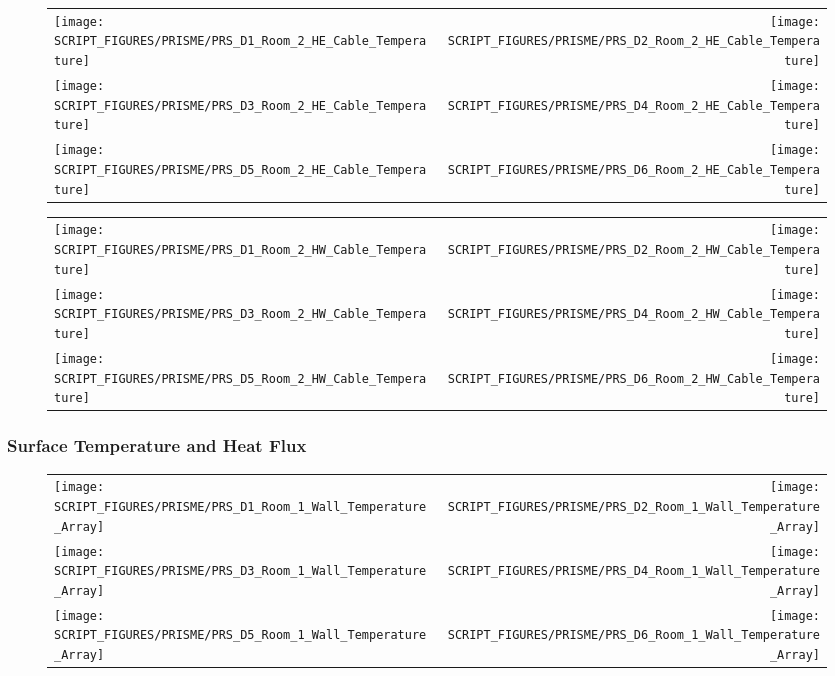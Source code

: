 \begin{figure}[p]
\begin{tabular*}{\textwidth}{l@{\extracolsep{\fill}}r}
\texttt{[image: SCRIPT\_FIGURES/PRISME/PRS\_D1\_Room\_2\_HE\_Cable\_Temperature]} &
\texttt{[image: SCRIPT\_FIGURES/PRISME/PRS\_D2\_Room\_2\_HE\_Cable\_Temperature]} \\
\texttt{[image: SCRIPT\_FIGURES/PRISME/PRS\_D3\_Room\_2\_HE\_Cable\_Temperature]} &
\texttt{[image: SCRIPT\_FIGURES/PRISME/PRS\_D4\_Room\_2\_HE\_Cable\_Temperature]} \\
\texttt{[image: SCRIPT\_FIGURES/PRISME/PRS\_D5\_Room\_2\_HE\_Cable\_Temperature]} &
\texttt{[image: SCRIPT\_FIGURES/PRISME/PRS\_D6\_Room\_2\_HE\_Cable\_Temperature]}
\end{tabular*}
\label{PRISME_HE_Cable_Room_2}
\end{figure}

\begin{figure}[p]
\begin{tabular*}{\textwidth}{l@{\extracolsep{\fill}}r}
\texttt{[image: SCRIPT\_FIGURES/PRISME/PRS\_D1\_Room\_2\_HW\_Cable\_Temperature]} &
\texttt{[image: SCRIPT\_FIGURES/PRISME/PRS\_D2\_Room\_2\_HW\_Cable\_Temperature]} \\
\texttt{[image: SCRIPT\_FIGURES/PRISME/PRS\_D3\_Room\_2\_HW\_Cable\_Temperature]} &
\texttt{[image: SCRIPT\_FIGURES/PRISME/PRS\_D4\_Room\_2\_HW\_Cable\_Temperature]} \\
\texttt{[image: SCRIPT\_FIGURES/PRISME/PRS\_D5\_Room\_2\_HW\_Cable\_Temperature]} &
\texttt{[image: SCRIPT\_FIGURES/PRISME/PRS\_D6\_Room\_2\_HW\_Cable\_Temperature]}
\end{tabular*}
\label{PRISME_HW_Cable_Room_2}
\end{figure}

\clearpage

\subsubsection{Surface Temperature and Heat Flux}

\begin{figure}[!ht]
\begin{tabular*}{\textwidth}{l@{\extracolsep{\fill}}r}
\texttt{[image: SCRIPT\_FIGURES/PRISME/PRS\_D1\_Room\_1\_Wall\_Temperature\_Array]} &
\texttt{[image: SCRIPT\_FIGURES/PRISME/PRS\_D2\_Room\_1\_Wall\_Temperature\_Array]} \\
\texttt{[image: SCRIPT\_FIGURES/PRISME/PRS\_D3\_Room\_1\_Wall\_Temperature\_Array]} &
\texttt{[image: SCRIPT\_FIGURES/PRISME/PRS\_D4\_Room\_1\_Wall\_Temperature\_Array]} \\
\texttt{[image: SCRIPT\_FIGURES/PRISME/PRS\_D5\_Room\_1\_Wall\_Temperature\_Array]} &
\texttt{[image: SCRIPT\_FIGURES/PRISME/PRS\_D6\_Room\_1\_Wall\_Temperature\_Array]}
\end{tabular*}
\label{PRISME_Wall_Array_Room_1}
\end{figure}


